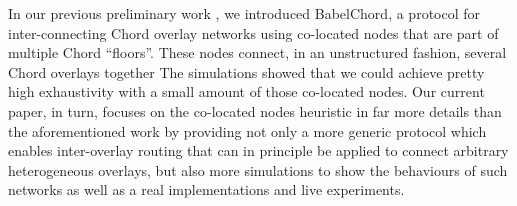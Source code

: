 In our previous preliminary work \cite{LTB09}, we introduced
BabelChord, a protocol for inter-connecting Chord overlay networks
using co-located nodes that are part of multiple Chord
``floors''. These nodes connect, in an unstructured fashion, several
Chord overlays together The simulations showed that we could achieve
pretty high exhaustivity with a small amount of those co-located
nodes. Our current paper, in turn, focuses on the co-located nodes
heuristic in far more details than the aforementioned work by
providing not only a more generic protocol which enables inter-overlay
routing that can in principle be applied to connect arbitrary
heterogeneous overlays, but also more simulations to show the
behaviours of such networks as well as a real implementations and live
experiments.







